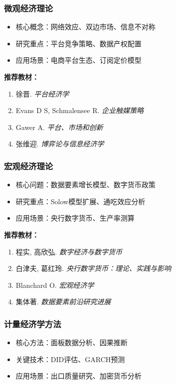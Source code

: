 \documentclass[lang=cn,12pt,a4paper]{elegantpaper}
\begin{document}
\subsubsection{微观经济理论}
\begin{itemize}[leftmargin=*,noitemsep]
    \item 核心概念：网络效应、双边市场、信息不对称
    \item 研究重点：平台竞争策略、数据产权配置
    \item 应用场景：电商平台生态、订阅定价模型
\end{itemize}

\noindent \textbf{推荐教材：}
\begin{enumerate}[leftmargin=*,nosep]
    \item 徐晋. \textit{平台经济学}
    \item Evans D S, Schmalensee R. \textit{企业触媒策略}
    \item Gawer A. \textit{平台、市场和创新}
    \item 张维迎. \textit{博弈论与信息经济学}
\end{enumerate}

\subsubsection{宏观经济理论}
\begin{itemize}[leftmargin=*,noitemsep]
    \item 核心问题：数据要素增长模型、数字货币政策
    \item 研究重点：Solow模型扩展、通吃效应分析
    \item 应用场景：央行数字货币、生产率测算
\end{itemize}

\noindent \textbf{推荐教材：}
\begin{enumerate}[leftmargin=*,nosep]
    \item 程实, 高欣弘. \textit{数字经济与数字货币}
    \item 白津夫, 葛红玲. \textit{央行数字货币：理论、实践与影响}
    \item Blanchard O. \textit{宏观经济学}
    \item 集体著. \textit{数据要素前沿研究进展}
\end{enumerate}

\subsubsection{计量经济学方法}
\begin{itemize}[leftmargin=*,noitemsep]
    \item 核心方法：面板数据分析、因果推断
    \item 关键技术：DID评估、GARCH预测
    \item 应用场景：出口质量研究、加密货币分析
\end{itemize}
\end{document}
